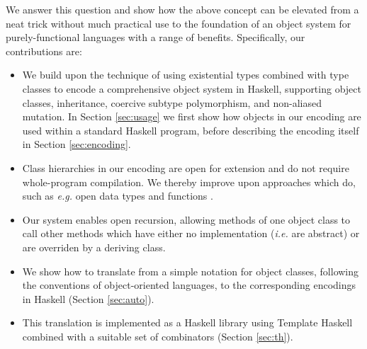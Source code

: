 We answer this question and show how the above concept can be elevated from a neat trick without much practical use to the foundation of an object system for purely-functional languages with a range of benefits. Specifically, our contributions are:
\begin{itemize}
    \item We build upon the technique of using existential types combined with type classes to encode a comprehensive object system in Haskell, supporting object classes, inheritance, coercive subtype polymorphism, and non-aliased mutation. In Section \ref{sec:usage} we first show how objects in our encoding are used within a standard Haskell program, before describing the encoding itself in Section \ref{sec:encoding}.
    \item Class hierarchies in our encoding are open for extension and do not require whole-program compilation. We thereby improve upon approaches which do, such as \emph{e.g.} open data types and functions \cite{loh2006open}.
    \item Our system enables open recursion, allowing methods of one object class to call other methods which have either no implementation (\emph{i.e.} are abstract) or are overriden by a deriving class.
    \item We show how to translate from a simple notation for object classes, following the conventions of object-oriented languages, to the corresponding encodings in Haskell (Section \ref{sec:auto}).
    \item This translation is implemented as a Haskell library using Template Haskell combined with a suitable set of combinators (Section \ref{sec:th}).
\end{itemize}